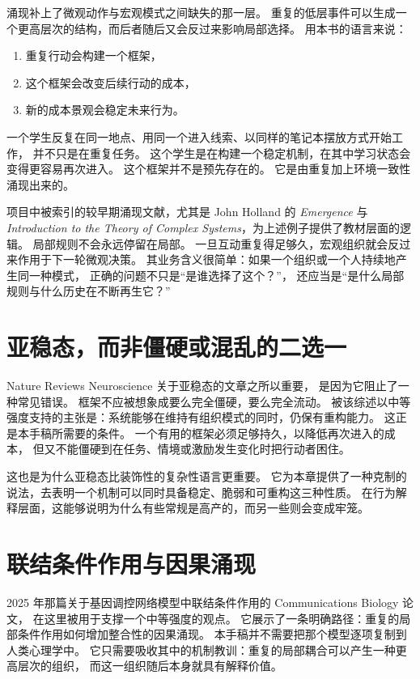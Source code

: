 涌现补上了微观动作与宏观模式之间缺失的那一层。
重复的低层事件可以生成一个更高层次的结构，而后者随后又会反过来影响局部选择。
用本书的语言来说：
\begin{enumerate}[nosep]
  \item 重复行动会构建一个框架，
  \item 这个框架会改变后续行动的成本，
  \item 新的成本景观会稳定未来行为。
\end{enumerate}

\begin{example}[学习身份作为一种涌现机制]
一个学生反复在同一地点、用同一个进入线索、以同样的笔记本摆放方式开始工作，
并不只是在重复任务。
这个学生是在构建一个稳定机制，在其中学习状态会变得更容易再次进入。
这个框架并不是预先存在的。
它是由重复加上环境一致性涌现出来的。
\end{example}

项目中被索引的较早期涌现文献，尤其是 John
Holland 的 \emph{Emergence} 与 \emph{Introduction to the Theory of Complex
Systems}，为上述例子提供了教材层面的逻辑。
局部规则不会永远停留在局部。
一旦互动重复得足够久，宏观组织就会反过来作用于下一轮微观决策。
其业务含义很简单：如果一个组织或一个人持续地产生同一种模式，
正确的问题不只是“是谁选择了这个？”，
还应当是“是什么局部规则与什么历史在不断再生它？”

\section{亚稳态，而非僵硬或混乱的二选一}

Nature Reviews Neuroscience 关于亚稳态的文章之所以重要，
是因为它阻止了一种常见错误。
框架不应被想象成要么完全僵硬，要么完全流动。
被该综述以中等强度支持的主张是：系统能够在维持有组织模式的同时，仍保有重构能力。
这正是本手稿所需要的条件。
一个有用的框架必须足够持久，以降低再次进入的成本，
但又不能僵硬到在任务、情境或激励发生变化时把行动者困住。

这也是为什么亚稳态比装饰性的复杂性语言更重要。
它为本章提供了一种克制的说法，去表明一个机制可以同时具备稳定、脆弱和可重构这三种性质。
在行为解释层面，这能够说明为什么有些常规是高产的，而另一些则会变成牢笼。

\section{联结条件作用与因果涌现}

2025 年那篇关于基因调控网络模型中联结条件作用的 Communications Biology 论文，
在这里被用于支撑一个中等强度的观点。
它展示了一条明确路径：重复的局部条件作用如何增加整合性的因果涌现。
本手稿并不需要把那个模型逐项复制到人类心理学中。
它只需要吸收其中的机制教训：重复的局部耦合可以产生一种更高层次的组织，
而这一组织随后本身就具有解释价值。

